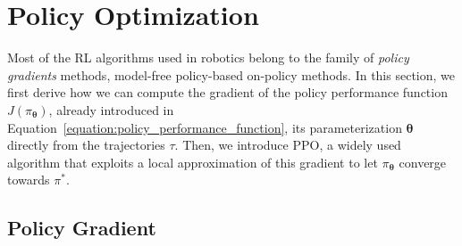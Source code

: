 \section{Policy Optimization}

Most of the \acl{RL} algorithms used in robotics belong to the family of \emph{policy gradients} methods, \ie model-free policy-based on-policy methods.
In this section, we first derive how we can compute the gradient of the policy performance function $J(\pi_{\boldsymbol{\theta}})$, already introduced in Equation~\eqref{equation:policy_performance_function}, \wrt its parameterization $\boldsymbol{\theta}$ directly from the trajectories $\tau$.
Then, we introduce \ac{PPO}, a widely used algorithm that exploits a local approximation of this gradient to let $\pi_{\boldsymbol{\theta}}$ converge towards $\pi^*$.

\subsection{Policy Gradient}

